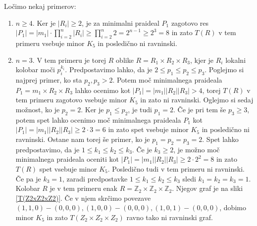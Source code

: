 \documentclass[a4paper, 12pt]{amsart}
\theoremstyle{definition} %
\theoremstyle{plain} %
\newcommand{\Z}{\mathbb Z}
\begin{document}
Ločimo nekaj primerov:
\begin{enumerate}
\item $n\ge 4$. Ker je $|R_i| \ge 2$, je za minimalni praideal $P_1$ zagotovo res $|P_1| = |m_1| \cdot \prod_{i=2}^n |R_i| \ge \prod_{i=2}^n 2 = 2^{n-1}\ge 2^3 = 8$ in zato $T(R)$ v tem primeru vsebuje minor $K_5$ in posledično ni ravninski.

\item $n=3$. V tem primeru je torej $R$ oblike $R= R_1 \times R_2 \times R_3$, kjer je $R_i$ lokalni kolobar moči $p_i^{k_i}$. Predpostavimo lahko, da je $2\le p_1 \le p_2 \le p_3$. Poglejmo si najprej primer, ko sta $p_2, p_3 > 2$. Potem moč minimalnega praideala $P_1 = m_1\times  R_2 \times R_3$ lahko ocenimo kot $|P_1| = |m_1| |R_2| |R_3| >4$, torej $T(R)$ v tem primeru zagotovo vsebuje minor $K_5$ in zato ni ravninski. Oglejmo si sedaj možnost, ko je $p_2 = 2$. Ker je $p_1\le p_2$, je tudi $p_1=2$. Če je pri tem še $p_3 \ge 3$, potem spet lahko ocenimo moč minimalnega praideala $P_1$ kot $|P_1| = |m_1||R_2||R_3| \ge 2\cdot 3 = 6$ in zato spet vsebuje minor $K_5$ in posledično ni ravninski. Ostane nam torej še primer, ko je $p_1 = p_2 = p_3 = 2$. Spet lahko predpostavimo, da je $1\le k_1 \le k_2 \le k_3$. Če je $k_3 \ge 2$, je možno moč minimalnega praideala oceniti kot $|P_1| = |m_1| |R_2||R_3| \ge 2 \cdot 2^2 = 8$ in zato $T(R)$ spet vsebuje minor $K_5$. Posledično tudi v tem primeru ni ravninski. Če pa je $k_3=1$, zaradi predpostavke $1 \le k_1 \le k_2 \le k_3$ sledi $k_1 = k_2 = k_3 = 1$. Kolobar $R$ je v tem primeru enak $R= \Z_2 \times \Z_2 \times \Z_2$. Njegov graf je na sliki \ref{T(Z2xZ2xZ2)}. Če v njem skrčimo povezave $(1,1,0)-(0,0,0),(1,0,0)-(0,0,0),(1,0,1)-(0,0,0)$, dobimo minor $K_5$ in zato $T(Z_2 \times Z_2 \times Z_2)$ ravno tako ni ravninski graf.

\begin{figure}[h!]
\centering
\end{figure}
\end{enumerate}
\end{document}
